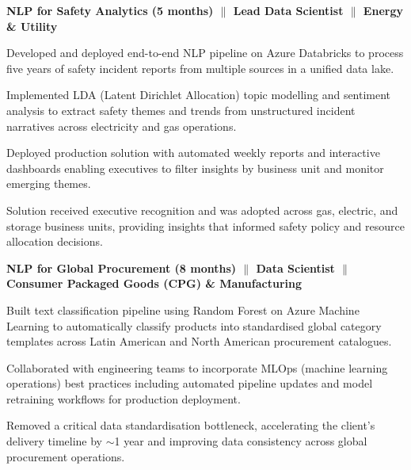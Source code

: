 

{\textbf{NLP for Safety Analytics (5 months) $\|$ Lead Data Scientist $\|$ Energy \& Utility}}
\begin{zitemize}
\item Developed and deployed end-to-end NLP pipeline on Azure Databricks to process five years of safety incident reports from multiple sources in a unified data lake.

\item Implemented LDA (Latent Dirichlet Allocation) topic modelling and sentiment analysis to extract safety themes and trends from unstructured incident narratives across electricity and gas operations.

\item Deployed production solution with automated weekly reports and interactive dashboards enabling executives to filter insights by business unit and monitor emerging themes.

\item Solution received executive recognition and was adopted across gas, electric, and storage business units, providing insights that informed safety policy and resource allocation decisions.
\end{zitemize}


{\textbf{NLP for Global Procurement (8 months) $\|$ Data Scientist $\|$  Consumer Packaged Goods (CPG) \& Manufacturing}}
\begin{zitemize}
\item Built text classification pipeline using Random Forest on Azure Machine Learning to automatically classify products into standardised global category templates across Latin American and North American procurement catalogues.

\item Collaborated with engineering teams to incorporate MLOps (machine learning operations) best practices including automated pipeline updates and model retraining workflows for production deployment.

\item Removed a critical data standardisation bottleneck, accelerating the client's delivery timeline by $\sim$1 year and improving data consistency across global procurement operations.
\end{zitemize}

